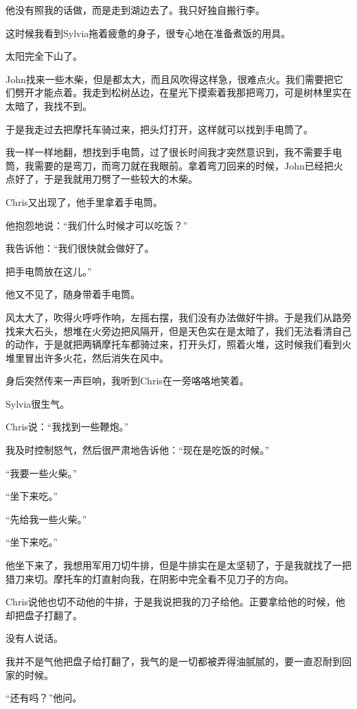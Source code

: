 \documentclass[UTF8]{article}
\begin{document}
\par 他没有照我的话做，而是走到湖边去了。我只好独自搬行李。
\par 这时候我看到Sylvia拖着疲惫的身子，很专心地在准备煮饭的用具。
\par 太阳完全下山了。
\par John找来一些木柴，但是都太大，而且风吹得这样急，很难点火。我们需要把它们劈开才能点着。我走到松树丛边，在星光下摸索着我那把弯刀，可是树林里实在太暗了，我找不到。
\par 于是我走过去把摩托车骑过来，把头灯打开，这样就可以找到手电筒了。
\par 我一样一样地翻，想找到手电筒，过了很长时间我才突然意识到，我不需要手电筒，我需要的是弯刀，而弯刀就在我眼前。拿着弯刀回来的时候，John已经把火点好了，于是我就用刀劈了一些较大的木柴。
\par Chris又出现了，他手里拿着手电筒。
\par 他抱怨地说：“我们什么时候才可以吃饭？”
\par 我告诉他：“我们很快就会做好了。
\par 把手电筒放在这儿。”
\par 他又不见了，随身带着手电筒。
\par 风太大了，吹得火呼呼作响，左摇右摆，我们没有办法做好牛排。于是我们从路旁找来大石头，想堆在火旁边把风隔开，但是天色实在是太暗了，我们无法看清自己的动作，于是就把两辆摩托车都骑过来，打开头灯，照着火堆，这时候我们看到火堆里冒出许多火花，然后消失在风中。
\par 身后突然传来一声巨响，我听到Chris在一旁咯咯地笑着。
\par Sylvia很生气。
\par Chris说：“我找到一些鞭炮。”
\par 我及时控制怒气，然后很严肃地告诉他：“现在是吃饭的时候。”
\par “我要一些火柴。”
\par “坐下来吃。”
\par “先给我一些火柴。”
\par “坐下来吃。”
\par 他坐下来了，我想用军用刀切牛排，但是牛排实在是太坚韧了，于是我就找了一把猎刀来切。摩托车的灯直射向我，在阴影中完全看不见刀子的方向。
\par Chris说他也切不动他的牛排，于是我说把我的刀子给他。正要拿给他的时候，他却把盘子打翻了。
\par 没有人说话。
\par 我并不是气他把盘子给打翻了，我气的是一切都被弄得油腻腻的，要一直忍耐到回家的时候。
\par “还有吗？”他问。
\end{document}
